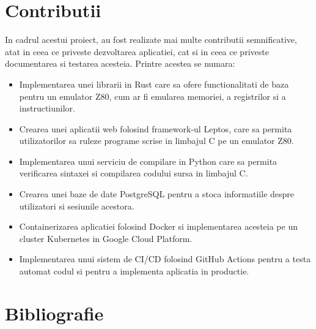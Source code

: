 \documentclass[titlepage,12pt]{article}
\begin{document}
\clearpage
\section{Contributii}
In cadrul acestui proiect, au fost realizate mai multe contributii semnificative, atat in ceea ce priveste dezvoltarea aplicatiei, cat si in ceea ce priveste documentarea si testarea acesteia. Printre acestea se numara:
\begin{itemize}
\item Implementarea unei librarii in Rust care sa ofere functionalitati de baza pentru un emulator Z80, cum ar fi emularea memoriei, a registrilor si a instructiunilor.
\item Crearea unei aplicatii web folosind framework-ul Leptos, care sa permita utilizatorilor sa ruleze programe scrise in limbajul C pe un emulator Z80.
\item Implementarea unui serviciu de compilare in Python care sa permita verificarea sintaxei si compilarea codului sursa in limbajul C.
\item Crearea unei baze de date PostgreSQL pentru a stoca informatiile despre utilizatori si sesiunile acestora.
\item Containerizarea aplicatiei folosind Docker si implementarea acesteia pe un cluster Kubernetes in Google Cloud Platform.
\item Implementarea unui sistem de CI/CD folosind GitHub Actions pentru a testa automat codul si pentru a implementa aplicatia in productie.
\end{itemize}

\clearpage
\section{Bibliografie}
\printbibliography
\end{document}
